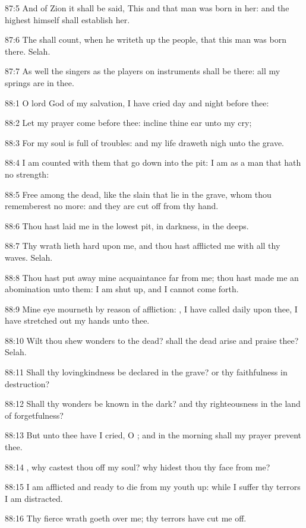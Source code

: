 87:5 And of Zion it shall be said, This and that man was born in her:
and the highest himself shall establish her.

87:6 The \LORD shall count, when he writeth up the people, that this
man was born there. Selah.

87:7 As well the singers as the players on instruments shall be there:
all my springs are in thee.



88:1 O lord God of my salvation, I have cried day and night before
thee:

88:2 Let my prayer come before thee: incline thine ear unto my cry;

88:3 For my soul is full of troubles: and my life draweth nigh unto
the grave.

88:4 I am counted with them that go down into the pit: I am as a man
that hath no strength:

88:5 Free among the dead, like the slain that lie in the grave, whom
thou rememberest no more: and they are cut off from thy hand.

88:6 Thou hast laid me in the lowest pit, in darkness, in the deeps.

88:7 Thy wrath lieth hard upon me, and thou hast afflicted me with all
thy waves. Selah.

88:8 Thou hast put away mine acquaintance far from me; thou hast made
me an abomination unto them: I am shut up, and I cannot come forth.

88:9 Mine eye mourneth by reason of affliction: \LORD, I have called
daily upon thee, I have stretched out my hands unto thee.

88:10 Wilt thou shew wonders to the dead? shall the dead arise and
praise thee? Selah.

88:11 Shall thy lovingkindness be declared in the grave? or thy
faithfulness in destruction?

88:12 Shall thy wonders be known in the dark? and thy righteousness in
the land of forgetfulness?

88:13 But unto thee have I cried, O \LORD; and in the morning shall my
prayer prevent thee.

88:14 \LORD, why castest thou off my soul? why hidest thou thy face
from me?

88:15 I am afflicted and ready to die from my youth up: while I suffer
thy terrors I am distracted.

88:16 Thy fierce wrath goeth over me; thy terrors have cut me off.

